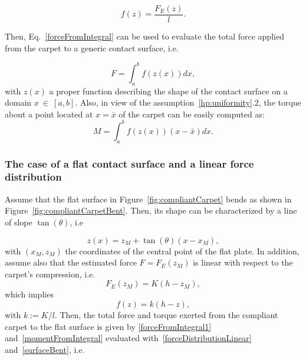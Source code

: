 \documentclass[12pt,a4paper,twoside]{article}
\begin{document}
\begin{equation}
f(z) = \frac{F_E(z)}{l}.
\end{equation}

Then, 
Eq.~\eqref{forceFromIntegral} can be used to evaluate  the total force applied from the carpet to a generic contact surface, i.e.

\begin{equation}
\label{forceFromIntegral1}
F = \int_{a}^{b} f(z(x)) dx,
\end{equation}
with $z(x)$  a proper function describing the shape of the  contact surface on a domain $x~\in~[a,b]$.
Also, in view of the assumption~\ref{hp:uniformity}.2, the torque about a point located at $x = \bar{x}$ of the carpet can  be easily computed as:
\begin{equation}
\label{momentFromIntegral}
M = \int_{a}^{b} f(z(x))(x-\bar{x}) dx.
\end{equation}

\subsubsection{The case of a flat contact surface and a linear force distribution}

Assume that the flat surface in Figure~\ref{fig:compliantCarpet} bends as shown in 
Figure~\ref{fig:compliantCarpetBent}. Then, its shape can be characterized by a line of slope $\tan(\theta)$, i.e

\begin{equation}
\label{surfaceBent}
z(x) = z_M + \tan(\theta) (x-x_M),
\end{equation}
with $(x_M,z_M)$ the coordinates of the central point of the flat plate.
In addition,
assume  also that the estimated force $F = F_E(z_M)$ is linear with respect to the carpet's compression, i.e.
\begin{equation*}
    F_E(z_M) = K(h-z_M),
\end{equation*}
which implies 
\begin{equation}
    \label{forceDistributionLinear}
    f(z) = k(h-z),
\end{equation}
with $k:= K/l$. Then, the total force and torque exerted from the compliant carpet to the flat surface is given by  \eqref{forceFromIntegral1} and~\eqref{momentFromIntegral} evaluated with~\eqref{forceDistributionLinear} and~\eqref{surfaceBent}, i.e.
\end{document}
